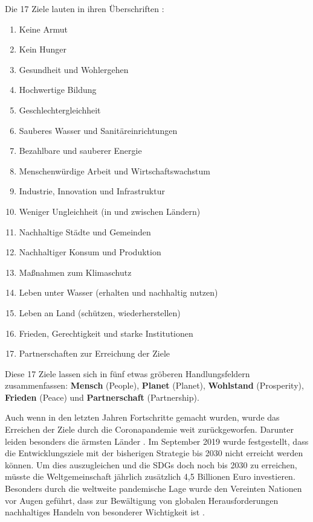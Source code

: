 \documentclass[a4paper,11pt]{article}
\begin{document}
Die 17 Ziele lauten in ihren Überschriften \cite{Agenda2030}:
\begin{enumerate}
\item Keine Armut
\item Kein Hunger 
\item Gesundheit und Wohlergehen 
\item Hochwertige Bildung 
\item Geschlechtergleichheit 
\item Sauberes Wasser und Sanitäreinrichtungen 
\item Bezahlbare und sauberer Energie 
\item Menschenwürdige Arbeit und Wirtschaftswachstum 
\item Industrie, Innovation und Infrastruktur
\item Weniger Ungleichheit (in und zwischen Ländern)
\item Nachhaltige Städte und Gemeinden
\item Nachhaltiger Konsum und Produktion 
\item Maßnahmen zum Klimaschutz
\item Leben unter Wasser (erhalten und nachhaltig nutzen)
\item Leben an Land (schützen, wiederherstellen)
\item Frieden, Gerechtigkeit und starke Institutionen 
\item Partnerschaften zur Erreichung der Ziele  
\end{enumerate}

Diese 17 Ziele lassen sich in fünf etwas gröberen Handlungsfeldern
zusammenfassen: \textbf{Mensch} (People), \textbf{Planet} (Planet),
\textbf{Wohlstand} (Prosperity), \textbf{Frieden} (Peace) und
\textbf{Partnerschaft} (Partnership).

Auch wenn in den letzten Jahren Fortschritte gemacht wurden, wurde das
Erreichen der Ziele durch die Coronapandemie weit zurückgeworfen. Darunter
leiden besonders die ärmsten Länder \cite{Agenda2030}. Im September 2019 wurde
festgestellt, dass die Entwicklungsziele mit der bisherigen Strategie bis 2030
nicht erreicht werden können. Um dies auszugleichen und die SDGs doch noch bis
2030 zu erreichen, müsste die Weltgemeinschaft jährlich zusätzlich 4,5
Billionen Euro investieren. Besonders durch die weltweite pandemische Lage
wurde den Vereinten Nationen vor Augen geführt, dass zur Bewältigung von
globalen Herausforderungen nachhaltiges Handeln von besonderer Wichtigkeit ist
\cite{Bericht}.
\end{document}
